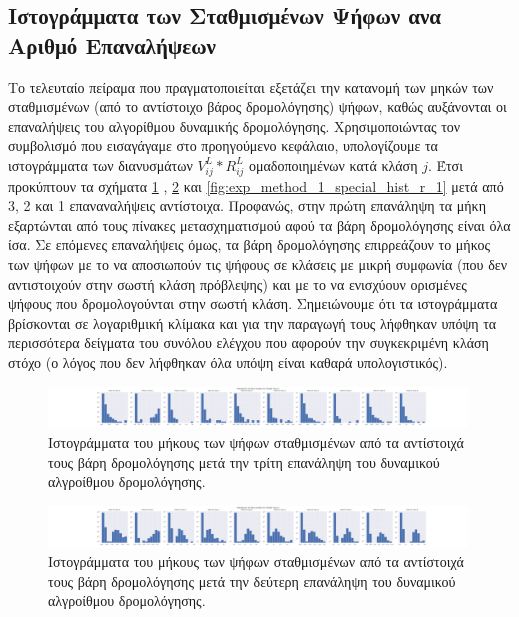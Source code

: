 \subsection{Ιστογράμματα των Σταθμισμένων Ψήφων ανα Αριθμό Επαναλήψεων}
Το τελευταίο πείραμα που πραγματοποιείται εξετάζει την κατανομή των μηκών των σταθμισμένων (από το αντίστοιχο βάρος δρομολόγησης) ψήφων, καθώς αυξάνονται οι επαναλήψεις του αλγορίθμου δυναμικής δρομολόγησης. Χρησιμοποιώντας τον συμβολισμό που εισαγάγαμε στο προηγούμενο κεφάλαιο, υπολογίζουμε τα ιστογράμματα των διανυσμάτων $V^L_{ij} \ast R^L_{ij}$ ομαδοποιημένων κατά κλάση $j$. Έτσι προκύπτουν τα σχήματα \ref{fig:exp_method_1_special_hist_r_3} , \ref{fig:exp_method_1_special_hist_r_2} και \ref{fig:exp_method_1_special_hist_r_1} μετά από 3, 2 και 1 επαναναλήψεις αντίστοιχα. Προφανώς, στην πρώτη επανάληψη τα μήκη εξαρτώνται από τους πίνακες μετασχηματισμού αφού τα βάρη δρομολόγησης είναι όλα ίσα. Σε επόμενες επαναλήψεις όμως, τα βάρη δρομολόγησης επιρρεάζουν το μήκος των ψήφων με το να αποσιωπούν τις ψήφους σε κλάσεις με μικρή συμφωνία (που δεν αντιστοιχούν στην σωστή κλάση πρόβλεψης) και με το να ενισχύουν ορισμένες ψήφους που δρομολογούνται στην σωστή κλάση. Σημειώνουμε ότι τα ιστογράμματα βρίσκονται σε λογαριθμική κλίμακα και για την παραγωγή τους λήφθηκαν υπόψη τα περισσότερα δείγματα του συνόλου ελέγχου που αφορούν την συγκεκριμένη κλάση στόχο (ο λόγος που δεν λήφθηκαν όλα υπόψη είναι καθαρά υπολογιστικός).
\begin{figure}[h]
    \centering
    \includegraphics[trim={14cm 0 13cm 0},clip, width=0.99\textwidth]{images/chapter experiments/method 1/image 14/hists_for_class_1_r_3.png}
    \caption{Ιστογράμματα του μήκους των ψήφων σταθμισμένων από τα αντίστοιχά τους βάρη δρομολόγησης μετά την τρίτη επανάληψη του δυναμικού αλγροίθμου δρομολόγησης.}
    \label{fig:exp_method_1_special_hist_r_3}
  \end{figure}

  \begin{figure}[h]
    \centering
    \includegraphics[trim={14cm 0 13cm 0},clip, width=0.99\textwidth]{images/chapter experiments/method 1/image 14/hists_for_class_1_r_2.png}
    \caption{Ιστογράμματα του μήκους των ψήφων σταθμισμένων από τα αντίστοιχά τους βάρη δρομολόγησης μετά την δεύτερη επανάληψη του δυναμικού αλγροίθμου δρομολόγησης.}
    \label{fig:exp_method_1_special_hist_r_2}
  \end{figure}

